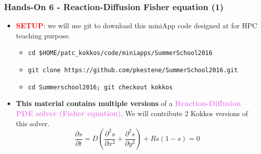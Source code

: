 \begin{frame}
  \frametitle{Hands-On 6 - Reaction-Diffusion Fisher equation (1)}

  \begin{itemize}
  \item \textcolor{red}{\textbf{SETUP}}: we will use git to download this miniApp code designed at  for HPC teaching purpose.
    \begin{itemize}
    \item \texttt{cd \$HOME/patc\_kokkos/code/miniapps/SummerSchool2016}
    \item \texttt{git clone https://github.com/pkestene/SummerSchool2016.git}
    \item \texttt{cd Summerschool2016; git checkout kokkos}
    \end{itemize}
  \item \textbf{This material contains multiple versions} of a \textcolor{violet}{\textbf{Reaction-Diffusion PDE solver (Fisher equation)}}. We will contribute 2 Kokkos versions of this solver.
    $$ \frac{\partial s}{\partial t} = D \left( \frac{\partial^2 s}{\partial x^2} + \frac{\partial^2 s}{\partial y^2} \right) + R s (1-s) = 0$$
  \end{itemize}
  
\end{frame}

